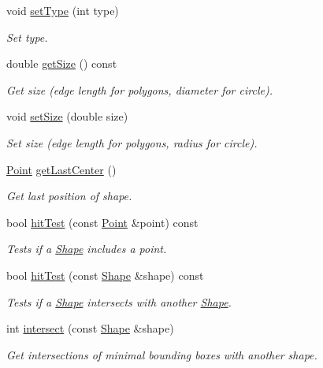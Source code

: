 \begin{DoxyCompactItemize}
void \hyperlink{classShape_a44bfca3ef6564ff0f34badc77f594862}{set\-Type} (int type)
\begin{DoxyCompactList}\small\item\em Set type. \end{DoxyCompactList}\item 
double \hyperlink{classShape_a1c04ad00113b2a8c0787c50edfa08c5c}{get\-Size} () const 
\begin{DoxyCompactList}\small\item\em Get size (edge length for polygons, diameter for circle). \end{DoxyCompactList}\item 
void \hyperlink{classShape_aaee049351828e1209697bb2b357ca61a}{set\-Size} (double size)
\begin{DoxyCompactList}\small\item\em Set size (edge length for polygons, radius for circle). \end{DoxyCompactList}\item 
\hyperlink{classPoint}{Point} \hyperlink{classShape_ac28a20365613c955cfb3ebc3f452b6c6}{get\-Last\-Center} ()
\begin{DoxyCompactList}\small\item\em Get last position of shape. \end{DoxyCompactList}\item 
bool \hyperlink{classShape_a0ff4bb8b9d0a6e6ad47ab3b7037b0302}{hit\-Test} (const \hyperlink{classPoint}{Point} \&point) const 
\begin{DoxyCompactList}\small\item\em Tests if a \hyperlink{classShape}{Shape} includes a point. \end{DoxyCompactList}\item 
bool \hyperlink{classShape_ab545013b4a52ccc4acd7d8a56d45d5c8}{hit\-Test} (const \hyperlink{classShape}{Shape} \&shape) const 
\begin{DoxyCompactList}\small\item\em Tests if a \hyperlink{classShape}{Shape} intersects with another \hyperlink{classShape}{Shape}. \end{DoxyCompactList}\item 
int \hyperlink{classShape_ad4e614404ea0276a9eee3d8299b24e98}{intersect} (const \hyperlink{classShape}{Shape} \&shape)
\begin{DoxyCompactList}\small\item\em Get intersections of minimal bounding boxes with another shape. \end{DoxyCompactList}\item 

\end{DoxyCompactItemize}
